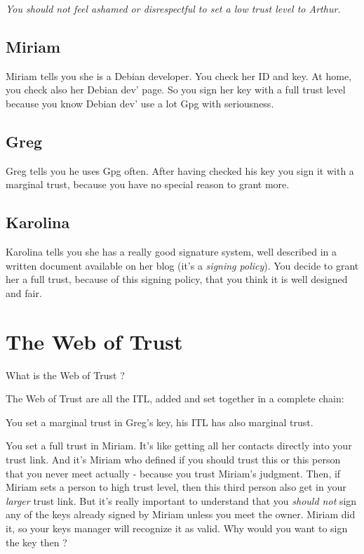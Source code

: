 \emph{You should not feel ashamed or disrespectful to set a low trust level to Arthur.}

\subsection{Miriam}\label{miriam}

Miriam tells you she is a Debian developer. You check her ID and key. At home, you check also her Debian dev' page. So you sign her key with a full trust level because you know Debian dev' use a lot Gpg with seriousness.

\subsection{Greg}\label{greg}

Greg tells you he uses Gpg often. After having checked his key you sign it with a marginal trust, because you have no special reason to grant more.

\subsection{Karolina}\label{karolina}

Karolina tells you she has a really good signature system, well described in a written document available on her blog (it's a
\emph{signing policy}). You decide to grant her a full trust, because of this signing policy, that you think it is well designed and fair.

\section{The Web of Trust}\label{the-web-of-trust}

What is the Web of Trust ?

The Web of Trust are all the ITL, added and set together in a complete chain:

You set a marginal trust in Greg's key, his ITL has also marginal trust.

You set a full trust in Miriam. It's like getting all her contacts directly into your trust link. And it's Miriam who defined if you
should trust this or this person that you never meet actually - because you trust Miriam's judgment. Then, if Miriam sets a person to high
trust level, then this third person also get in your \emph{larger} trust link. But it's really important to understand that you \emph{should not} sign any of the keys already signed by Miriam unless you meet the owner. Miriam did it, so your keys manager will recognize it as valid. Why would you want to sign the key then ?

